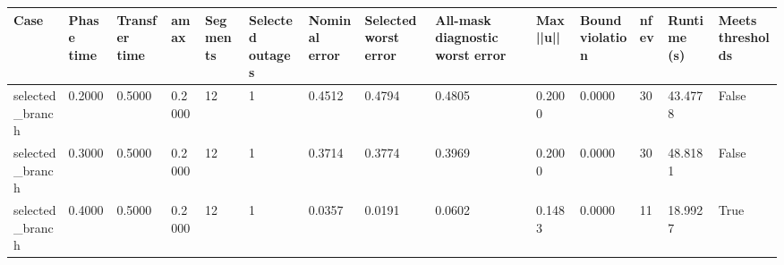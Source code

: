 \begin{tabular}{llllllllllllll}
\toprule
Case & Phase time & Transfer time & amax & Segments & Selected outages & Nominal error & Selected worst error & All-mask diagnostic worst error & Max ||u|| & Bound violation & nfev & Runtime (s) & Meets thresholds \\
\midrule
selected\_branch & 0.2000 & 0.5000 & 0.2000 & 12 & 1 & 0.4512 & 0.4794 & 0.4805 & 0.2000 & 0.0000 & 30 & 43.4778 & False \\
selected\_branch & 0.3000 & 0.5000 & 0.2000 & 12 & 1 & 0.3714 & 0.3774 & 0.3969 & 0.2000 & 0.0000 & 30 & 48.8181 & False \\
selected\_branch & 0.4000 & 0.5000 & 0.2000 & 12 & 1 & 0.0357 & 0.0191 & 0.0602 & 0.1483 & 0.0000 & 11 & 18.9927 & True \\
\bottomrule
\end{tabular}
